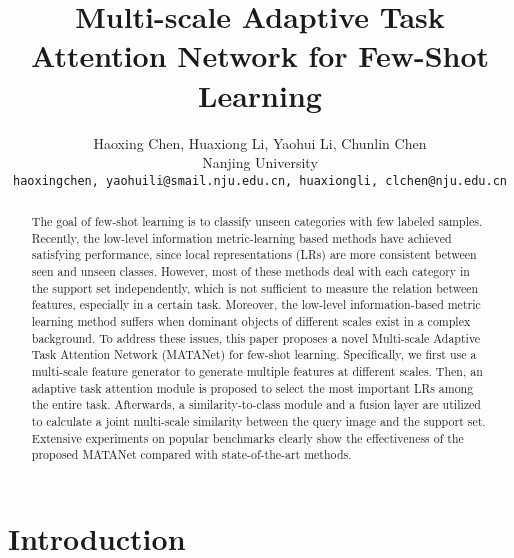 \documentclass[final]{cvpr}
\begin{document}
	
\title{Multi-scale Adaptive Task Attention Network for Few-Shot Learning}
	
	\author{Haoxing Chen, Huaxiong Li, Yaohui Li, Chunlin Chen\\
		Nanjing University\\
		{\tt\small haoxingchen, yaohuili@smail.nju.edu.cn, huaxiongli, clchen@nju.edu.cn}
}
	
	\maketitle
	
	
	\begin{abstract}
The goal of few-shot learning is to classify unseen categories with few labeled samples. Recently, the low-level information metric-learning based methods have achieved satisfying performance, since local representations (LRs) are more consistent between seen and unseen classes. However, most of these methods deal with each category in the support set independently, which is not sufficient to measure the relation between features, especially in a certain task.  Moreover, the low-level information-based metric learning method suffers when dominant objects of different scales exist in a complex background. To address these issues, this paper proposes a novel Multi-scale Adaptive Task Attention Network (MATANet) for few-shot learning. Specifically, we first use a multi-scale feature generator to generate multiple features at different scales. Then, an adaptive task attention module is proposed to select the most important LRs among the entire task. Afterwards, a similarity-to-class module and a fusion layer are utilized to calculate a joint multi-scale similarity between the query image and the support set. Extensive experiments on popular benchmarks clearly show the effectiveness of the proposed MATANet compared with state-of-the-art methods. 
	\end{abstract}
	


	\section{Introduction}
	
\end{document}
